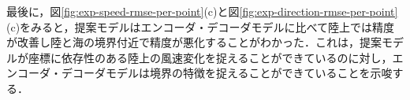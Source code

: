 最後に，図\ref{fig:exp-speed-rmse-per-point}(c)と図\ref{fig:exp-direction-rmse-per-point}(c)をみると，提案モデルはエンコーダ・デコーダモデルに比べて陸上では精度が改善し陸と海の境界付近で精度が悪化することがわかった．これは，提案モデルが座標に依存性のある陸上の風速変化を捉えることができているのに対し，エンコーダ・デコーダモデルは境界の特徴を捉えることができていることを示唆する．

